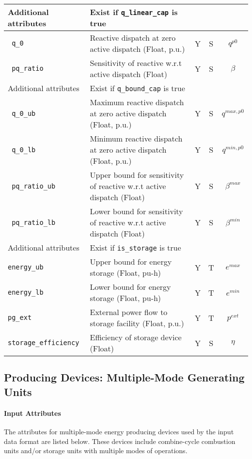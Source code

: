 \documentclass{article}
\begin{document}
\begin{center}
\small
\begin{tabular}{ l | l | c | c | c |}
 \hline
  Additional attributes & Exist if {\tt q\_linear\_cap} is true &  &  & \\
  \hline
  {\tt\color{red} q\_0}               & Reactive dispatch at zero active dispatch (Float, p.u.) & Y & S & $q^{p0}$\\
  {\tt\color{red} pq\_ratio}          & Sensitivity of reactive w.r.t active dispatch (Float) & Y & S & $\beta$\\
  \hline \hline
  Additional attributes & Exist if {\tt q\_bound\_cap} is true &  &  & \\
  \hline
  {\tt\color{red} q\_0\_ub}           & Maximum reactive dispatch at zero active dispatch (Float, p.u.) & Y & S & $q^{max,p0}$\\
  {\tt\color{red} q\_0\_lb}           & Minimum reactive dispatch at zero active dispatch (Float, p.u.) & Y & S & $q^{min,p0}$\\
  {\tt\color{red} pq\_ratio\_ub}      & Upper bound for sensitivity of reactive w.r.t active dispatch (Float) & Y & S & $\beta^{max}$\\
  {\tt\color{red} pq\_ratio\_lb}      & Lower bound for sensitivity of reactive w.r.t active dispatch (Float) & Y & S & $\beta^{min}$\\
  \hline 
  
  Additional attributes & Exist if {\tt is\_storage} is true &  &  & \\
  \hline
  {\tt energy\_ub} & Upper bound for energy storage (Float, pu-h)& Y & T & $e^{max}$\\
  {\tt energy\_lb} & Lower bound for energy storage (Float, pu-h)& Y & T & $e^{min}$\\ 
  {\tt pg\_ext} & External power flow to storage facility (Float, p.u.)& Y & T & $p^{ext}$\\ 
  {\tt storage\_efficiency} & Efficiency of storage device (Float) & Y & S & $\eta$\\
  \hline
\end{tabular}
\end{center}

\subsection{Producing Devices: Multiple-Mode Generating Units}
\label{nom:gen_single}
\label{nom:gen_single}
\paragraph{Input Attributes} The attributes for 
multiple-mode energy producing devices used by the input data format are listed below.
These devices include combine-cycle combustion units and/or storage units with multiple modes of operations. 
\end{document}
